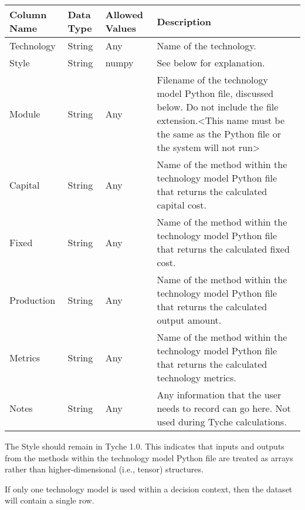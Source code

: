 \documentclass[letterpaper,10pt,english]{sphinxmanual}
\begin{document}
\begin{savenotes}\sphinxattablestart
\centering
{}
\sphinxthecaptionisattop
{}\label{\detokenize{cheat-sheet:table-8}}\label{\detokenize{cheat-sheet:tbl-functionsdict}}
\sphinxaftertopcaption
\begin{tabulary}{\linewidth}[t]{|T|T|T|T|}
\hline
\sphinxstyletheadfamily 
Column Name
&\sphinxstyletheadfamily 
Data Type
&\sphinxstyletheadfamily 
Allowed Values
&\sphinxstyletheadfamily 
Description
\\
\hline
Technology
&
String
&
Any
&
Name of the technology.
\\
\hline
Style
&
String
&
numpy
&
See below for explanation.
\\
\hline
Module
&
String
&
Any
&
Filename of the technology model Python file, discussed below. Do not include the file extension.\textless{}This name must be the same as the Python file or the system will not run\textgreater{}
\\
\hline
Capital
&
String
&
Any
&
Name of the method within the technology model Python file that returns the calculated capital cost.
\\
\hline
Fixed
&
String
&
Any
&
Name of the method within the technology model Python file that returns the calculated fixed cost.
\\
\hline
Production
&
String
&
Any
&
Name of the method within the technology model Python file that returns the calculated output amount.
\\
\hline
Metrics
&
String
&
Any
&
Name of the method within the technology model Python file that returns the calculated technology metrics.
\\
\hline
Notes
&
String
&
Any
&
Any information that the user needs to record can go here. Not used during Tyche calculations.
\\
\hline
\end{tabulary}
\par
\sphinxattableend\end{savenotes}

The Style should remain  in Tyche 1.0. This indicates that inputs and outputs from the methods within the technology model Python file are treated as arrays rather than higher-dimensional (i.e., tensor) structures.

If only one technology model is used within a decision context, then the  dataset will contain a single row.
\end{document}

